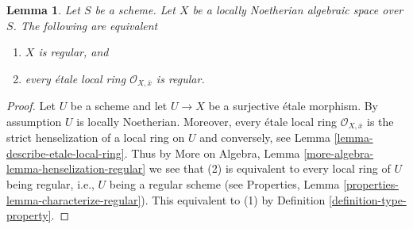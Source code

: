 \documentclass[10pt,a4paper]{amsart}
\theoremstyle{plain}
\newtheorem{lemma}[subsection]{Lemma}
\theoremstyle{definition}
\theoremstyle{remark}
\numberwithin{equation}{subsection}
\begin{document}
\begin{lemma}
\label{lemma-regular}
Let $S$ be a scheme.
Let $X$ be a locally Noetherian algebraic space over $S$.
The following are equivalent
\begin{enumerate}
\item $X$ is regular, and
\item every \'etale local ring $\mathcal{O}_{X, \overline{x}}$ is
regular.
\end{enumerate}
\end{lemma}

\begin{proof}
Let $U$ be a scheme and let $U \to X$ be a surjective \'etale morphism.
By assumption $U$ is locally Noetherian. Moreover, every \'etale local
ring $\mathcal{O}_{X, \overline{x}}$ is the strict henselization of
a local ring on $U$ and conversely, see
Lemma \ref{lemma-describe-etale-local-ring}.
Thus by
More on Algebra, Lemma \ref{more-algebra-lemma-henselization-regular}
we see that (2) is equivalent to every local ring of $U$ being
regular, i.e., $U$ being a regular scheme (see
Properties, Lemma \ref{properties-lemma-characterize-regular}).
This equivalent to (1) by
Definition \ref{definition-type-property}.
\end{proof}
\end{document}
